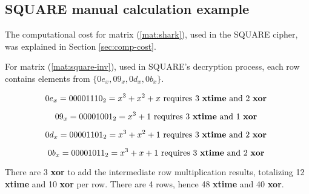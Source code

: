 \subsection{SQUARE manual calculation example}
The computational cost for matrix (\ref{mat:shark}), used in the SQUARE cipher, was explained in Section \ref{sec:comp-cost}.

For matrix (\ref{mat:square-inv}), used in SQUARE's decryption process, each row contains elements from $\{0e_x, 09_x, 0d_x, 0b_x\}$.

\begin{equation*}
0e_x = 00001110_2 = x^3 + x^2 + x \text{ requires 3 \textbf{xtime} and 2 \textbf{xor} }
\end{equation*}

\begin{equation*}
09_x = 00001001_2 = x^3 + 1 \text{ requires 3 \textbf{xtime} and 1 \textbf{xor} }
\end{equation*}

\begin{equation*}
0d_x = 00001101_2 = x^3 + x^2 + 1 \text{ requires 3 \textbf{xtime} and 2 \textbf{xor} }
\end{equation*}

\begin{equation*}
0b_x = 00001011_2 = x^3 + x + 1 \text{ requires 3 \textbf{xtime} and 2 \textbf{xor} }
\end{equation*}

There are 3 \textbf{xor} to add the intermediate row multiplication results, totalizing 12 \textbf{xtime} and 10 \textbf{xor} per row. There are 4 rows, hence 48 \textbf{xtime} and 40 \textbf{xor}.

